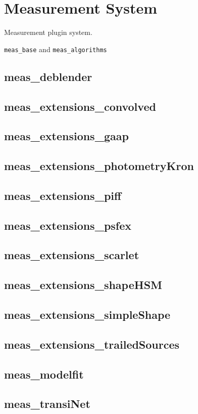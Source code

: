 \section{Measurement System}
\label{sec:meas}

Measurement plugin system.

\texttt{meas\_base} and \texttt{meas\_algorithms}


\subsection{meas\_deblender}
\subsection{meas\_extensions\_convolved}
\subsection{meas\_extensions\_gaap}
\subsection{meas\_extensions\_photometryKron}
\subsection{meas\_extensions\_piff}
\subsection{meas\_extensions\_psfex}
\subsection{meas\_extensions\_scarlet}
\subsection{meas\_extensions\_shapeHSM}
\subsection{meas\_extensions\_simpleShape}
\subsection{meas\_extensions\_trailedSources}
\subsection{meas\_modelfit}
\subsection{meas\_transiNet}
